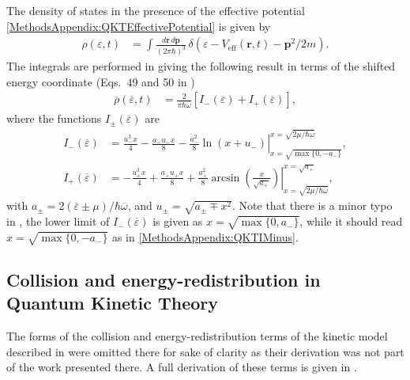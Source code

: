 The density of states in the presence of the effective potential \eqref{MethodsAppendix:QKTEffectivePotential} is given by
\begin{align}
    \rho(\varepsilon, t) &= \int \frac{d \bm{r}\, d \bm{p}}{(2\pi \hbar)^3} \,\delta\left(\varepsilon - V_\text{eff}(\bm{r}, t) - \bm{p}^2/2 m\right).
    \label{MethodsAppendix:DensityOfStatesDefinition}
\end{align}
The integrals are performed in \citep{Bijlsma:2000} giving the following result in terms of the shifted energy coordinate (Eqs.~49 and 50 in \citep{Bijlsma:2000})
\begin{align}
    \overline{\rho}(\overline{\varepsilon}, t) &= \frac{2}{\pi \hbar \overline{\omega}} \left[I_-(\overline{\varepsilon}) + I_+(\overline{\varepsilon})\right],
\end{align}
where the functions $I_\pm(\overline{\varepsilon})$ are
\begin{align}
    I_-(\overline{\varepsilon}) &= \left.\frac{u_-^3 x}{4} - \frac{a_- u_- x}{8} - \frac{a_-^2}{8}\ln(x + u_-)\right|_{x=\sqrt{\max\{0, -a_-\}}}^{x=\sqrt{2\mu/\hbar \overline{\omega}}}, \label{MethodsAppendix:QKTIMinus}\\
    I_+(\overline{\varepsilon}) &= \left.- \frac{u_+^3 x}{4} + \frac{a_+ u_+ x}{8} + \frac{a_+^2}{8} \arcsin\left(\frac{x}{\sqrt{a_+}}\right)\right|_{x=\sqrt{2\mu/\hbar\overline{\omega}}}^{x=\sqrt{a_+}}, \label{MethodsAppendix:QKTIPlus}
\end{align}
with $a_\pm = 2(\overline{\varepsilon}\pm \mu)/\hbar\overline{\omega}$, and $u_\pm = \sqrt{a_\pm \mp x^2}$. Note that there is a minor typo in \citet{Bijlsma:2000}, the lower limit of $I_-(\overline{\varepsilon})$ is given as $x=\sqrt{\max\{0, a_-\}}$, while it should read $x=\sqrt{\max\{0, -a_-\}}$ as in \eqref{MethodsAppendix:QKTIMinus}.

\subsection{Collision and energy-redistribution in Quantum Kinetic Theory}
\label{MethodsAppendix:QKTOtherTerms}

The forms of the collision and energy-redistribution terms of the kinetic model described in  were omitted there for sake of clarity as their derivation was not part of the work presented there.  A full derivation of these terms is given in \citep{Bijlsma:2000,Proukakis:2008}.

